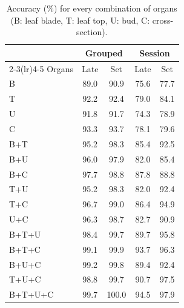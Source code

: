 \begin{table}[tbp]
\centering
\footnotesize
\caption{Accuracy (\%) for every combination of organs (B: leaf blade, T: leaf top, U: bud, C: cross-section).}
\label{tab:fusion_subsets}
\begin{tabular}{lcccc}
\toprule
 & \multicolumn{2}{c}{Grouped} & \multicolumn{2}{c}{Session} \\ \cmidrule(lr){2-3}\cmidrule(lr){4-5}
Organs & Late & Set & Late & Set \\
\midrule
B & 89.0 & 90.9 & 75.6 & 77.7 \\
T & 92.2 & 92.4 & 79.0 & 84.1 \\
U & 91.8 & 91.7 & 74.3 & 78.9 \\
C & 93.3 & 93.7 & 78.1 & 79.6 \\
\midrule
B+T & 95.2 & 98.3 & 85.4 & 92.5 \\
B+U & 96.0 & 97.9 & 82.0 & 85.4 \\
B+C & 97.7 & 98.8 & 87.8 & 88.8 \\
T+U & 95.2 & 98.3 & 82.0 & 92.4 \\
T+C & 96.7 & 99.0 & 86.4 & 94.9 \\
U+C & 96.3 & 98.7 & 82.7 & 90.9 \\
\midrule
B+T+U & 98.4 & 99.7 & 89.7 & 95.8 \\
B+T+C & 99.1 & 99.9 & 93.7 & 96.3 \\
B+U+C & 99.2 & 99.8 & 89.4 & 92.4 \\
T+U+C & 98.8 & 99.7 & 90.7 & 97.5 \\
\midrule
B+T+U+C & 99.7 & 100.0 & 94.5 & 97.9 \\
\bottomrule
\end{tabular}
\end{table}